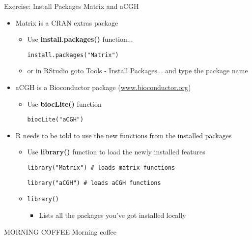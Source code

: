 \documentclass{beamer}
\begin{document}
\begin{frame}{Exercise: Install Packages Matrix and aCGH}
    \begin{itemize}
        \item Matrix is a CRAN extras package
        \begin{itemize}
            \item Use \textbf{install.packages()} function...
            \begin{verbatim}
install.packages("Matrix")\end{verbatim}
\item or in RStudio goto Tools - Install Packages... and type the package name
        \end{itemize}
        \item aCGH is a Bioconductor package (\url{www.bioconductor.org})
        \begin{itemize}
            \item Use \textbf{biocLite()} function
            \begin{verbatim}
biocLite("aCGH")\end{verbatim}
        \end{itemize}
        \item R needs to be told to use the new functions from the installed packages
        \begin{itemize}
            \item Use \textbf{library()} function to load the newly installed features
            \begin{verbatim}library("Matrix") # loads matrix functions\end{verbatim}
            \begin{verbatim}library("aCGH") # loads aCGH functions\end{verbatim}
            \item {\tt library()}
            \begin{itemize}
                \item Lists all the packages you've got installed locally
            \end{itemize}
        \end{itemize}
    \end{itemize}
\end{frame}

\begin{frame}{MORNING COFFEE}
Morning coffee
\end{frame}
\end{document}
